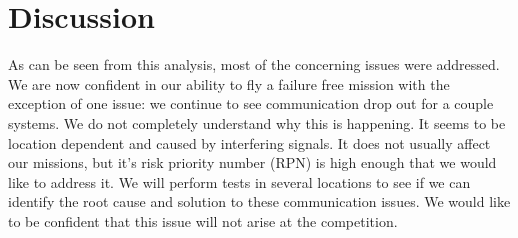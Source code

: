 \documentclass[]{auvsi_doc}
\begin{document}
\section{Discussion}
As can be seen from this analysis, most of the concerning issues were addressed. We are now confident in our ability to fly a failure free mission with the exception of one issue: we continue to see communication drop out for a couple systems. We do not completely understand why this is happening. It seems to be location dependent and caused by interfering signals. It does not usually affect our missions, but it's risk priority number (RPN) is high enough that we would like to address it. We will perform tests in several locations to see if we can identify the root cause and solution to these communication issues. We would like to be confident that this issue will not arise at the competition.
\end{document}
